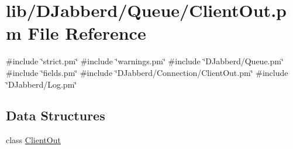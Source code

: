 \hypertarget{_queue_2_client_out_8pm}{
\section{lib/\-D\-Jabberd/\-Queue/\-Client\-Out.pm \-File \-Reference}
\label{_queue_2_client_out_8pm}
}
{\ttfamily \#include \char`\"{}strict.\-pm\char`\"{}}\*
{\ttfamily \#include \char`\"{}warnings.\-pm\char`\"{}}\*
{\ttfamily \#include \char`\"{}\-D\-Jabberd/\-Queue.\-pm\char`\"{}}\*
{\ttfamily \#include \char`\"{}fields.\-pm\char`\"{}}\*
{\ttfamily \#include \char`\"{}\-D\-Jabberd/\-Connection/\-Client\-Out.\-pm\char`\"{}}\*
{\ttfamily \#include \char`\"{}\-D\-Jabberd/\-Log.\-pm\char`\"{}}\*
\subsection*{\-Data \-Structures}
\begin{DoxyCompactItemize}
\item 
class \hyperlink{class_d_jabberd_1_1_queue_1_1_client_out}{\-Client\-Out}
\end{DoxyCompactItemize}
